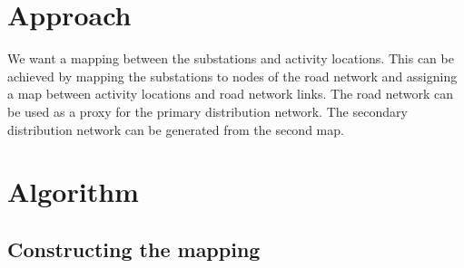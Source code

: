 \section{Approach}\label{sec:approach}
We want a mapping between the substations and activity locations. This can be achieved by mapping the substations to nodes of the road network and assigning a map between activity locations and road network links. The road network can be used as a proxy for the primary distribution network. The secondary distribution network can be generated from the second map.

\section{Algorithm}
\subsection{Constructing the mapping}\label{subsec:map}
